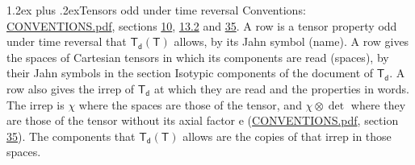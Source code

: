 \documentclass[10pt,a4paper]{article}
\makeatletter
\renewcommand\section{\@startsection{section}{1}{\z@}{-3ex plus -1ex minus -.2ex}%
  {1.2ex plus .2ex}{\normalfont\large\sffamily\bfseries\color{parttitle}}}
\numberwithin{equation}{section}
\newcommand{\grp}[1]{\mathsf{#1}}
\newcommand{\irrprod}{\otimes}
\makeatother
\begin{document}
\section{Tensors odd under time reversal}\label{s:time_odd}
Conventions: \href{../../CONVENTIONS.pdf}{CONVENTIONS.pdf}, sections \href{../../../rotation/CONVENTIONS.pdf\#conv.10}{10}, \href{../../../rotation/CONVENTIONS.pdf\#conv.13.2}{13.2} and \href{../../CONVENTIONS.pdf\#conv.35}{35}.
\leavevmode\label{n:head.name.property}A row is a tensor property odd under time reversal that $\grp{T_{d}}(\grp{T})$ allows, by its Jahn symbol (name). \label{n:head.spaces}A row gives the spaces of Cartesian tensors in which its components are read (spaces), by their Jahn symbols in the section Isotypic components of the document of \href{../../../rotation/data/pdf/Td.pdf}{$\grp{T_{d}}$}. \label{n:head.properties}A row also gives the irrep of $\grp{T_{d}}$ at which they are read and the properties in words. The irrep is $\chi$ where the spaces are those of the tensor, and $\chi \irrprod \det$ where they are those of the tensor without its axial factor e (\href{../../CONVENTIONS.pdf}{CONVENTIONS.pdf}, section \href{../../CONVENTIONS.pdf\#conv.35}{35}). The components that $\grp{T_{d}}(\grp{T})$ allows are the copies of that irrep in those spaces.
\end{document}
